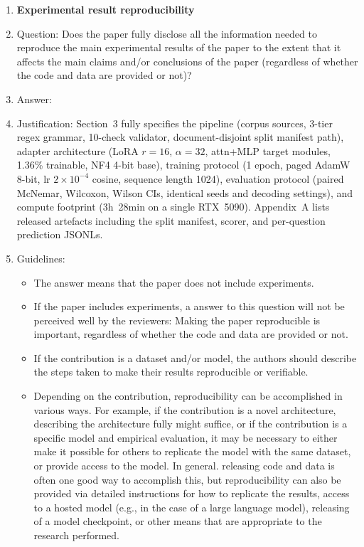 \begin{enumerate}
    \item {\bf Experimental result reproducibility}
    \item[] Question: Does the paper fully disclose all the information needed to reproduce the main experimental results of the paper to the extent that it affects the main claims and/or conclusions of the paper (regardless of whether the code and data are provided or not)?
    \item[] Answer: \answerYes{}
    \item[] Justification: Section~3 fully specifies the pipeline (corpus sources, 3-tier regex grammar, 10-check validator, document-disjoint split manifest path), adapter architecture (LoRA $r{=}16$, $\alpha{=}32$, attn+MLP target modules, 1.36\% trainable, NF4 4-bit base), training protocol (1 epoch, paged AdamW 8-bit, lr $2\times10^{-4}$ cosine, sequence length 1024), evaluation protocol (paired McNemar, Wilcoxon, Wilson CIs, identical seeds and decoding settings), and compute footprint (3h~28min on a single RTX~5090). Appendix~A lists released artefacts including the split manifest, scorer, and per-question prediction JSONLs.
    \item[] Guidelines:
    \begin{itemize}
        \item The answer \answerNA{} means that the paper does not include experiments.
        \item If the paper includes experiments, a \answerNo{} answer to this question will not be perceived well by the reviewers: Making the paper reproducible is important, regardless of whether the code and data are provided or not.
        \item If the contribution is a dataset and\slash or model, the authors should describe the steps taken to make their results reproducible or verifiable.
        \item Depending on the contribution, reproducibility can be accomplished in various ways. For example, if the contribution is a novel architecture, describing the architecture fully might suffice, or if the contribution is a specific model and empirical evaluation, it may be necessary to either make it possible for others to replicate the model with the same dataset, or provide access to the model. In general. releasing code and data is often one good way to accomplish this, but reproducibility can also be provided via detailed instructions for how to replicate the results, access to a hosted model (e.g., in the case of a large language model), releasing of a model checkpoint, or other means that are appropriate to the research performed.

\end{itemize}
\end{enumerate}
